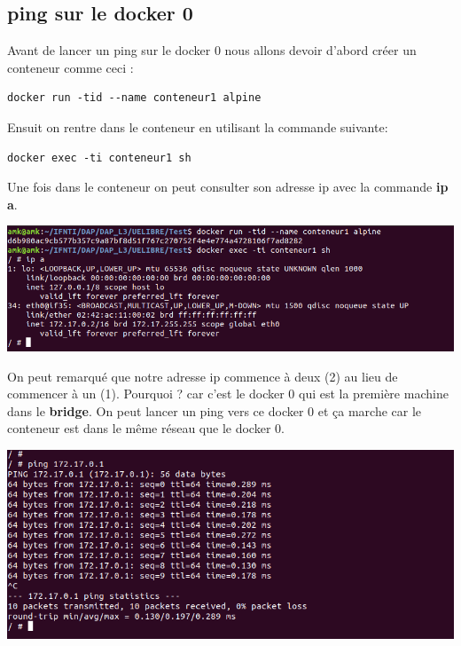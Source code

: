 \documentclass[12pt,a4paper]{article}
\begin{document}
\subsection{ping sur le docker 0}
Avant de lancer un ping sur le docker 0 nous allons devoir d'abord créer un conteneur comme
ceci :
\begin{verbatim}
docker run -tid --name conteneur1 alpine
\end{verbatim}
Ensuit on rentre dans le conteneur en utilisant la commande suivante:
\begin{verbatim}
docker exec -ti conteneur1 sh 
\end{verbatim}
Une fois dans le conteneur on peut consulter son adresse ip avec la commande \textbf{ip a}.
\begin{center}
\includegraphics[scale=0.3]{img/ip_a_c1.png}
\end{center}
On peut remarqué que notre adresse ip commence à deux (2) au lieu de commencer à un (1).
Pourquoi ? car c'est le docker 0 qui est la première machine dans le \textbf{bridge}. On
peut lancer un ping vers ce docker 0 et ça marche car le conteneur est dans le même 
réseau que le docker 0.
\begin{center}
\includegraphics[scale=0.3]{img/ping_c1.png}
\end{center}
\end{document}

